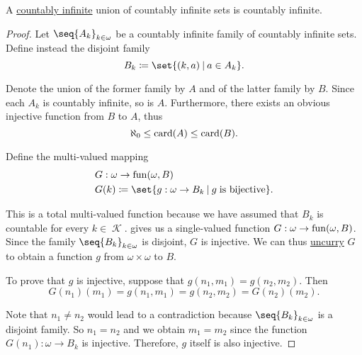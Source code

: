 \begin{proposition}\label{thm:countably_infinite_union_of_countably_infinite_sets}
  A \hyperref[def:set_countability/countably_infinite]{countably infinite} union of countably infinite sets is countably infinite.
\end{proposition}
\begin{proof}
  Let \( \seq{ A_k }_{k \in \omega} \) be a countably infinite family of countably infinite sets. Define instead the disjoint family
  \begin{equation*}
    B_k \coloneqq \set{ (k, a) \given a \in A_k }.
  \end{equation*}

  Denote the union of the former family by \( A \) and of the latter family by \( B \). Since each \( A_k \) is countably infinite, so is \( A \). Furthermore, there exists an obvious injective function from \( B \) to \( A \), thus
  \begin{equation}\label{eq:thm:countably_infinite_union_of_countably_infinite_sets/union_card_inequality}
    \aleph_0 \leq \operatorname{card}(A) \leq \operatorname{card}(B).
  \end{equation}

  Define the multi-valued mapping
  \begin{equation*}
    \begin{aligned}
      &G: \omega \to \fun(\omega, B) \\
      &G(k) \coloneqq \set{ g: \omega \to B_k \given g \T{is bijective} }.
    \end{aligned}
  \end{equation*}

  This is a total multi-valued function because we have assumed that \( B_k \) is countable for every \( k \in \mscrK \).  gives us a single-valued function \( G: \omega \to \operatorname{fun}(\omega, B) \). Since the family \( \seq{ B_k }_{k \in \omega} \) is disjoint, \( G \) is injective. We can thus \hyperref[def:function/currying]{uncurry} \( G \) to obtain a function \( g \) from \( \omega \times \omega \) to \( B \).

  To prove that \( g \) is injective, suppose that \( g(n_1, m_1) = g(n_2, m_2) \). Then
  \begin{equation*}
    G(n_1)(m_1) = g(n_1, m_1) = g(n_2, m_2) = G(n_2)(m_2).
  \end{equation*}

  Note that \( n_1 \neq n_2 \) would lead to a contradiction because  \( \seq{ B_k }_{k \in \omega} \) is a disjoint family. So \( n_1 = n_2 \) and we obtain \( m_1 = m_2 \) since the function \( G(n_1): \omega \to B_k \) is injective. Therefore, \( g \) itself is also injective.


\end{proof}
